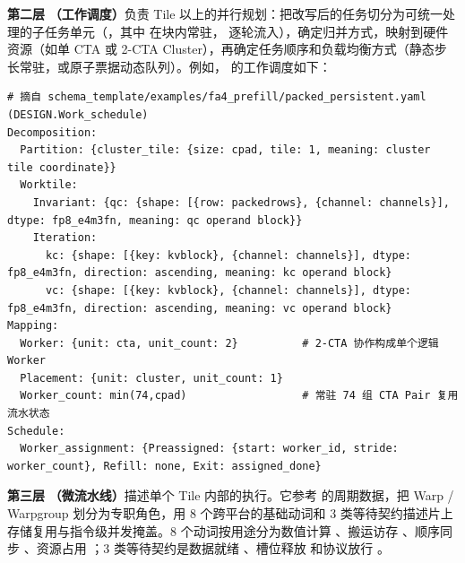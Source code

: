 \textbf{第二层} \textbf{（工作调度）}负责 Tile 以上的并行规划：把改写后的任务切分为可统一处理的子任务单元（，其中  在块内常驻， 逐轮流入），确定归并方式，映射到硬件资源（如单 CTA 或 2-CTA Cluster），再确定任务顺序和负载均衡方式（静态步长常驻，或原子票据动态队列）。例如， 的工作调度如下：
\begin{CodeBox}
\begin{Verbatim}[breaklines,breakanywhere,breaksymbolleft={},breaksymbolright={},breakautoindent=true]
# 摘自 schema_template/examples/fa4_prefill/packed_persistent.yaml (DESIGN.Work_schedule)
Decomposition:
  Partition: {cluster_tile: {size: cpad, tile: 1, meaning: cluster tile coordinate}}
  Worktile:
    Invariant: {qc: {shape: [{row: packedrows}, {channel: channels}], dtype: fp8_e4m3fn, meaning: qc operand block}}
    Iteration:
      kc: {shape: [{key: kvblock}, {channel: channels}], dtype: fp8_e4m3fn, direction: ascending, meaning: kc operand block}
      vc: {shape: [{key: kvblock}, {channel: channels}], dtype: fp8_e4m3fn, direction: ascending, meaning: vc operand block}
Mapping:
  Worker: {unit: cta, unit_count: 2}          # 2-CTA 协作构成单个逻辑 Worker
  Placement: {unit: cluster, unit_count: 1}
  Worker_count: min(74,cpad)                  # 常驻 74 组 CTA Pair 复用流水状态
Schedule:
  Worker_assignment: {Preassigned: {start: worker_id, stride: worker_count}, Refill: none, Exit: assigned_done}
\end{Verbatim}
\end{CodeBox}

\textbf{第三层} \textbf{（微流水线）}描述单个 Tile 内部的执行。它参考  的周期数据，把 Warp / Warpgroup 划分为专职角色，用 8 个跨平台的基础动词和 3 类等待契约描述片上存储复用与指令级并发掩盖。8 个动词按用途分为数值计算 、搬运访存 、顺序同步 、资源占用 ；3 类等待契约是数据就绪 、槽位释放  和协议放行 。

